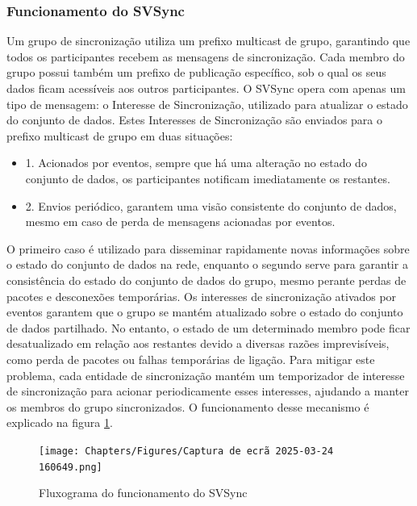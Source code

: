 \subsubsection{Funcionamento do \gls{SVSync}}
Um grupo de sincronização utiliza um prefixo multicast de grupo, garantindo que todos os participantes recebem as mensagens de sincronização. Cada membro do grupo possui também um prefixo de publicação específico, sob o qual os seus dados ficam acessíveis aos outros participantes.
O \gls{SVSync} opera com apenas um tipo de mensagem: o Interesse de Sincronização, utilizado para atualizar o estado do conjunto de dados. Estes Interesses de Sincronização são enviados para o prefixo multicast de grupo em duas situações:
\begin{itemize}
    \item 1. Acionados por eventos, sempre que há uma alteração no estado do conjunto de dados, os participantes notificam imediatamente os restantes.
    \item 2. Envios periódico, garantem uma visão consistente do conjunto de dados, mesmo em caso de perda de mensagens acionadas por eventos.
\end{itemize}
O primeiro caso é utilizado para disseminar rapidamente novas informações sobre o estado do conjunto de dados na rede, enquanto o segundo serve para garantir a consistência do estado do conjunto de dados do grupo, mesmo perante perdas de pacotes e desconexões temporárias.
Os interesses de sincronização ativados por eventos garantem que o grupo se mantém atualizado sobre o estado do conjunto de dados partilhado. No entanto, o estado de um determinado membro pode ficar desatualizado em relação aos restantes devido a diversas razões imprevisíveis, como perda de pacotes ou falhas temporárias de ligação. Para mitigar este problema, cada entidade de sincronização mantém um temporizador de interesse de sincronização para acionar periodicamente esses interesses, ajudando a manter os membros do grupo sincronizados.
O funcionamento desse mecanismo é explicado na figura \ref{fig:SVsyync}.

\clearpage
    \begin{figure}[h]
        \centering
        \texttt{[image: Chapters/Figures/Captura de ecrã 2025-03-24 160649.png]}
        \caption{Fluxograma do funcionamento do \gls{SVSync} \cite{moll_brief_nodate}} 
        \label{fig:SVsyync}   
    \end{figure}

